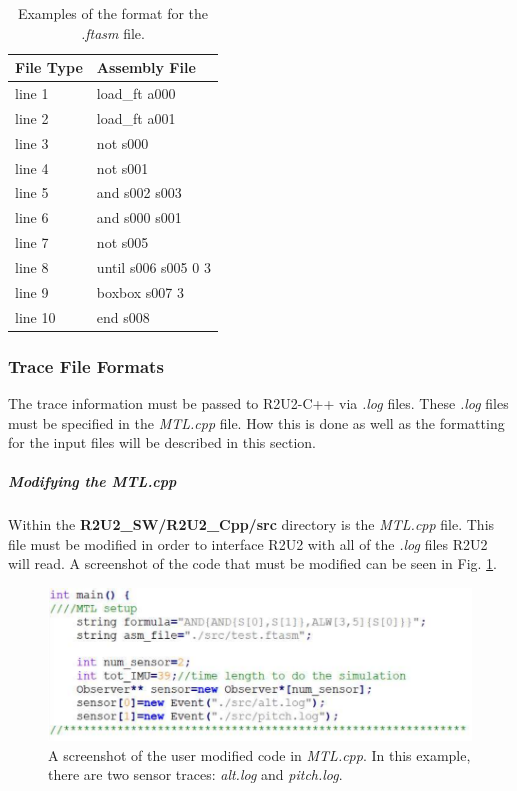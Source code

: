 \begin{table}[H]
	\caption{Examples of the format for the \textit{.ftasm} file.
	\label{CppFileTable}}
	\begin{center}
	\begin{tabular}{l | l}
		\hline
		\hline
		\textbf{File Type} & \textbf{Assembly File}\\
		\hline
		line 1 & load\_ft a000\\
		line 2 & load\_ft a001\\
		line 3 & not s000\\
		line 4 & not s001\\
		line 5 & and s002 s003\\
		line 6 & and s000 s001\\
		line 7 & not s005\\
		line 8 & until s006 s005 0 3\\
		line 9 & boxbox s007 3\\
		line 10 & end s008\\
		\hline
		\hline
	\end{tabular}
	\end{center}
\end{table}

\subsubsection{Trace File Formats}
\label{Cpp_Sensor}
The trace information must be passed to R2U2-C++ via \textit{.log} files. These \textit{.log} files must be specified in the \textit{MTL.cpp} file. How this is done as well as the formatting for the input files will be described in this section.

\subparagraph{Modifying the \textit{MTL.cpp}}
\label{Mod_MTL}
Within the \textbf{R2U2\_SW/R2U2\_Cpp/src} directory is the \textit{MTL.cpp} file. This file must be modified in order to interface R2U2 with all of the \textit{.log} files R2U2 will read. A screenshot of the code that must be modified can be seen in Fig. \ref{fig:r2u2cppMod}. 

\begin{figure}[H]
	\begin{center}
	\includegraphics[scale=0.5]{fig/r2u2_cpp_MTL.pdf}
	\caption{A screenshot of the user modified code in \textit{MTL.cpp}. In this example, there are two sensor traces: \textit{alt.log} and \textit{pitch.log}.
	\label{fig:r2u2cppMod}} 
	\end{center}
\end{figure} 

